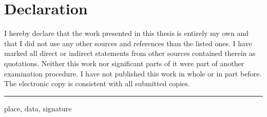 \chapter*{Declaration}
I hereby declare that the work presented in this thesis is entirely
my own and that I did not use any other sources and references
than the listed ones. I have marked all direct or indirect statements
from other sources contained therein as quotations. Neither this
work nor significant parts of it were part of another examination
procedure. I have not published this work in whole or in part
before. The electronic copy is consistent with all submitted copies.

\vspace*{2cm}
\parindent0pt
\rule{\linewidth}{0.1mm}
place, data, signature
